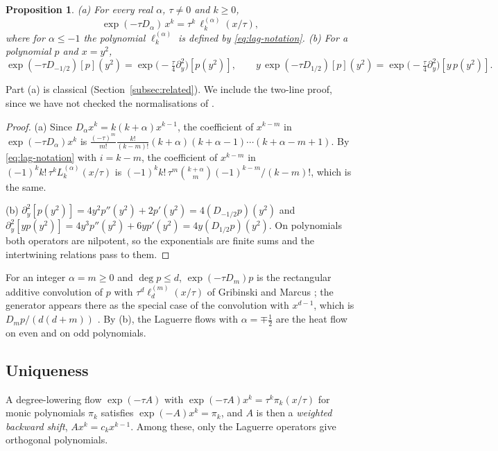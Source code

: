 \documentclass[11pt]{amsart}
\newtheorem{proposition}[theorem]{Proposition}
\theoremstyle{definition}
\theoremstyle{remark}
\numberwithin{equation}{section}
\begin{document}
\begin{proposition}\label{prop:lag-identity}
(a) For every real $\alpha$, $\tau\ne0$ and $k\ge0$,
\[
\exp(-\tau D_\alpha)\,x^k=\tau^k\,\ell^{(\alpha)}_k(x/\tau),
\]
where for $\alpha\le-1$ the polynomial $\ell^{(\alpha)}_k$ is defined by \eqref{eq:lag-notation}. (b) For a polynomial $p$ and $x=y^2$,
\[
\exp(-\tau D_{-1/2})[p](y^2)=\exp\bigl(-\tfrac\tau4\partial_y^2\bigr)[p(y^2)],\qquad y\,\exp(-\tau D_{1/2})[p](y^2)=\exp\bigl(-\tfrac\tau4\partial_y^2\bigr)[y\,p(y^2)].
\]
\end{proposition}

Part (a) is classical (Section~\ref{subsec:related}). We include the two-line proof, since we have not checked the normalisations of \cite{Br,Ha}.

\begin{proof}
(a) Since $D_\alpha x^k=k(k+\alpha)x^{k-1}$, the coefficient of $x^{k-m}$ in $\exp(-\tau D_\alpha)x^k$ is $\frac{(-\tau)^m}{m!}\frac{k!}{(k-m)!}(k+\alpha)(k+\alpha-1)\cdots(k+\alpha-m+1)$. By \eqref{eq:lag-notation} with $i=k-m$, the coefficient of $x^{k-m}$ in $(-1)^kk!\,\tau^kL^{(\alpha)}_k(x/\tau)$ is $(-1)^kk!\,\tau^m\binom{k+\alpha}m(-1)^{k-m}/(k-m)!$, which is the same.

(b) $\partial_y^2[p(y^2)]=4y^2p''(y^2)+2p'(y^2)=4(D_{-1/2}p)(y^2)$ and $\partial_y^2[yp(y^2)]=4y^3p''(y^2)+6yp'(y^2)=4y(D_{1/2}p)(y^2)$. On polynomials both operators are nilpotent, so the exponentials are finite sums and the intertwining relations pass to them.
\end{proof}

For an integer $\alpha=m\ge0$ and $\deg p\le d$, $\exp(-\tau D_m)p$ is the rectangular additive convolution of $p$ with $\tau^d\ell^{(m)}_d(x/\tau)$ of Gribinski and Marcus \cite[Definition~2.1 and (3)]{GM}; the generator appears there as the special case of the convolution with $x^{d-1}$, which is $D_mp/(d(d+m))$ \cite{GM}. By (b), the Laguerre flows with $\alpha=\mp\frac12$ are the heat flow on even and on odd polynomials.

\subsection{Uniqueness}\label{subsec:lag-unique}
A degree-lowering flow $\exp(-\tau A)$ with $\exp(-\tau A)x^k=\tau^k\pi_k(x/\tau)$ for monic polynomials $\pi_k$ satisfies $\exp(-A)x^k=\pi_k$, and $A$ is then a \emph{weighted backward shift}, $Ax^k=c_kx^{k-1}$. Among these, only the Laguerre operators give orthogonal polynomials.
\end{document}
